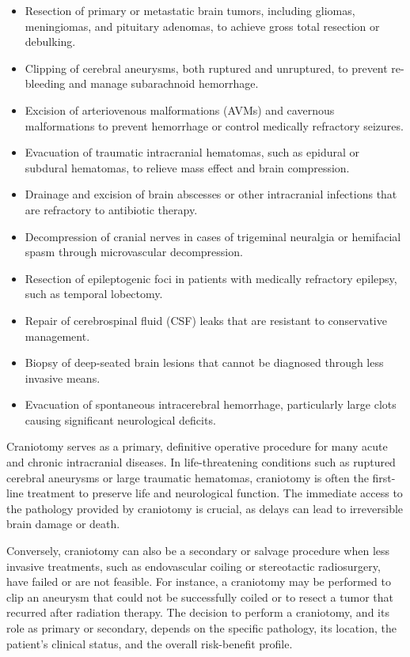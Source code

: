 \begin{itemize}
  \item Resection of primary or metastatic brain tumors, including gliomas, meningiomas, and pituitary adenomas, to achieve gross total resection or debulking.
  \item Clipping of cerebral aneurysms, both ruptured and unruptured, to prevent re-bleeding and manage subarachnoid hemorrhage.
  \item Excision of arteriovenous malformations (AVMs) and cavernous malformations to prevent hemorrhage or control medically refractory seizures.
  \item Evacuation of traumatic intracranial hematomas, such as epidural or subdural hematomas, to relieve mass effect and brain compression.
  \item Drainage and excision of brain abscesses or other intracranial infections that are refractory to antibiotic therapy.
  \item Decompression of cranial nerves in cases of trigeminal neuralgia or hemifacial spasm through microvascular decompression.
  \item Resection of epileptogenic foci in patients with medically refractory epilepsy, such as temporal lobectomy.
  \item Repair of cerebrospinal fluid (CSF) leaks that are resistant to conservative management.
  \item Biopsy of deep-seated brain lesions that cannot be diagnosed through less invasive means.
  \item Evacuation of spontaneous intracerebral hemorrhage, particularly large clots causing significant neurological deficits.
\end{itemize}

Craniotomy serves as a primary, definitive operative procedure for many acute and chronic intracranial diseases. In life-threatening conditions such as ruptured cerebral aneurysms or large traumatic hematomas, craniotomy is often the first-line treatment to preserve life and neurological function. The immediate access to the pathology provided by craniotomy is crucial, as delays can lead to irreversible brain damage or death.

Conversely, craniotomy can also be a secondary or salvage procedure when less invasive treatments, such as endovascular coiling or stereotactic radiosurgery, have failed or are not feasible. For instance, a craniotomy may be performed to clip an aneurysm that could not be successfully coiled or to resect a tumor that recurred after radiation therapy. The decision to perform a craniotomy, and its role as primary or secondary, depends on the specific pathology, its location, the patient's clinical status, and the overall risk-benefit profile.

